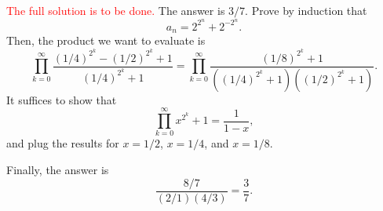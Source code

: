 \begin{sk}{}{}
	\textcolor{red}{The full solution is to be done.} The answer is \(\boxed{3/7.}\) Prove by induction that \[
		a_n = 2^{2^n} + 2^{-2^n}.
	\]
	Then, the product we want to evaluate is \[
		\prod_{k=0}^\infty \frac{(1/4)^{2^k} - (1/2)^{2^k} + 1}{(1/4)^{2^k} + 1} = 
		\prod_{k=0}^\infty \frac{(1/8)^{2^k} + 1}{((1/4)^{2^k} + 1)((1/2)^{2^k} + 1)}.
	\]
	It suffices to show that \[
		\prod_{k=0}^\infty x^{2^k} + 1 = \frac{1}{1 - x},
	\] and plug the results for \(x = 1/2\), \(x = 1/4\), and \(x = 1/8\).

	Finally, the answer is \[
		\frac{8/7}{(2/1)(4/3)} = \frac{3}{7}.
	\]
\end{sk}
